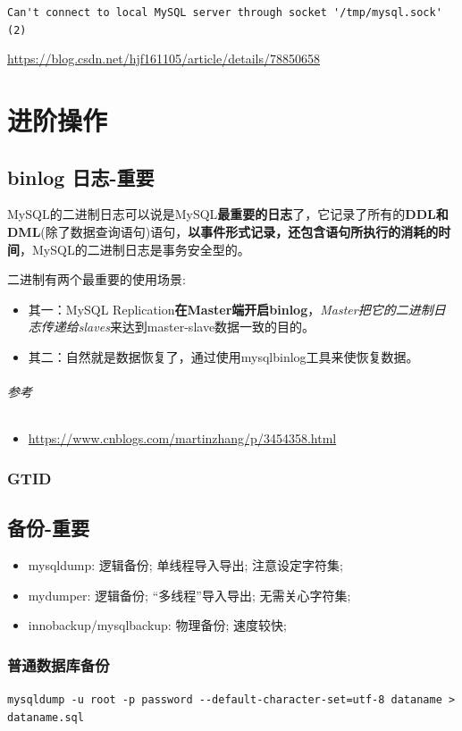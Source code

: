 \documentclass[UTF8,a4paper,12pt]{ctexbook}
\begin{document}
		\verb|Can't connect to local MySQL server through socket '/tmp/mysql.sock' (2)|
		
		\url{https://blog.csdn.net/hjf161105/article/details/78850658}

	
\chapter{进阶操作} 
	\section{binlog 日志-重要}
		MySQL的二进制日志可以说是MySQL\textbf{最重要的日志}了，它记录了所有的\textbf{DDL和DML}(除了数据查询语句)语句，\textbf{以事件形式记录，还包含语句所执行的消耗的时间}，MySQL的二进制日志是事务安全型的。
		
		二进制有两个最重要的使用场景: 
			\begin{itemize}
				\item 其一：MySQL Replication\textbf{在Master端开启binlog}，\textit{Master把它的二进制日志传递给slaves}来达到master-slave数据一致的目的。 
				\item 其二：自然就是数据恢复了，通过使用mysqlbinlog工具来使恢复数据。
			\end{itemize}    
		    
		\subparagraph{参考}
			\begin{itemize}
				\item \url{https://www.cnblogs.com/martinzhang/p/3454358.html}
			\end{itemize}
			
		\subsection{GTID}
		
	\section{备份-重要}
		\begin{itemize}
			\item mysqldump: 逻辑备份; 单线程导入导出; 注意设定字符集; 
			\item mydumper: 逻辑备份; “多线程”导入导出; 无需关心字符集;
			\item innobackup/mysqlbackup: 物理备份; 速度较快;
		\end{itemize}
		\subsection{普通数据库备份}
			\verb|mysqldump -u root -p password --default-character-set=utf-8 dataname > dataname.sql|
			
\end{document}
